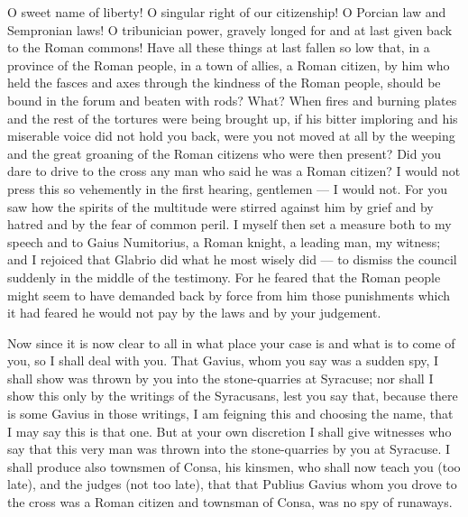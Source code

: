  O sweet name of liberty! O singular right of our citizenship! O Porcian law and Sempronian laws! O tribunician power, gravely longed for and at last given back to the Roman commons! Have all these things at last fallen so low that, in a province of the Roman people, in a town of allies, a Roman citizen, by him who held the fasces and axes through the kindness of the Roman people, should be bound in the forum and beaten with rods? What? When fires and burning plates and the rest of the tortures were being brought up, if his bitter imploring and his miserable voice did not hold you back, were you not moved at all by the weeping and the great groaning of the Roman citizens who were then present? Did you dare to drive to the cross any man who said he was a Roman citizen? I would not press this so vehemently in the first hearing, gentlemen --- I would not. For you saw how the spirits of the multitude were stirred against him by grief and by hatred and by the fear of common peril. I myself then set a measure both to my speech and to Gaius Numitorius, a Roman knight, a leading man, my witness; and I rejoiced that Glabrio did what he most wisely did --- to dismiss the council suddenly in the middle of the testimony. For he feared that the Roman people might seem to have demanded back by force from him those punishments which it had feared he would not pay by the laws and by your judgement.

 Now since it is now clear to all in what place your case is and what is to come of you, so I shall deal with you. That Gavius, whom you say was a sudden spy, I shall show was thrown by you into the stone-quarries at Syracuse; nor shall I show this only by the writings of the Syracusans, lest you say that, because there is some Gavius in those writings, I am feigning this and choosing the name, that I may say this is that one. But at your own discretion I shall give witnesses who say that this very man was thrown into the stone-quarries by you at Syracuse. I shall produce also townsmen of Consa, his kinsmen, who shall now teach you (too late), and the judges (not too late), that that Publius Gavius whom you drove to the cross was a Roman citizen and townsman of Consa, was no spy of runaways.

